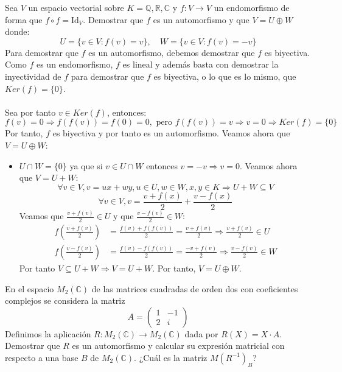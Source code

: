 \begin{ejercicio}
	Sea \( V \) un espacio vectorial sobre \( K = \mathbb{Q}, \mathbb{R}, \mathbb{C} \) y \( f : V \rightarrow V \) un endomorfismo de forma que \( f \circ f = \text{Id}_V \). Demostrar que \( f \) es un automorfismo y que \( V = U \oplus W \) donde:
	\[ U = \{ v \in V : f(v) = v \}, \quad W = \{ v \in V : f(v) = -v \} \]
	Para demostrar que $f$ es un automorfismo, debemos demostrar que $f$ es biyectiva. Como $f$ es un endomorfismo, $f$ es lineal y además basta con demostrar la
	inyectividad de $f$ para demostrar que $f$ es biyectiva, o lo que es lo mismo, que $Ker(f) = \{0\}$. \\ \\
	Sea por tanto $v \in Ker(f)$, entonces:
	\begin{equation*}
		f(v) = 0 \Rightarrow f(f(v)) = f(0) = 0, \text{ pero } f(f(v)) = v \Rightarrow v = 0 \Rightarrow Ker(f) = \{0\}
	\end{equation*}
	Por tanto, $f$ es biyectiva y por tanto es un automorfismo. Veamos ahora que $V = U \oplus W$:
	\begin{itemize}
		\item {} $U \cap W = \{0\}$ ya que si $v \in U \cap W$ entonces $v=-v \Rightarrow v=0$. Veamos ahora que $V = U + W$:
		      \begin{equation*}
			      \forall v \in V, v=ux+wy, u \in U, w \in W, x,y \in K \Rightarrow U + W \subseteq V
		      \end{equation*}
		      \begin{equation*}
			      \forall v \in V, v = \frac{v+f(x)}{2}+\frac{v-f(x)}{2}
		      \end{equation*}
		      Veamos que $\frac{v+f(v)}{2} \in U$ y que $\frac{v-f(v)}{2} \in W$:
		      \begin{align*}
			      f\left(\frac{v+f(v)}{2}\right) & = \frac{f(v)+f(f(v))}{2} = \frac{v+f(v)}{2} \Rightarrow \frac{v+f(v)}{2} \in U  \\
			      f\left(\frac{v-f(v)}{2}\right) & = \frac{f(v)-f(f(v))}{2} = \frac{-v+f(v)}{2} \Rightarrow \frac{v-f(v)}{2} \in W
		      \end{align*}
		      Por tanto $V \subseteq U + W \Rightarrow V = U + W$. Por tanto, $V = U \oplus W$.
	\end{itemize}
\end{ejercicio}

\begin{ejercicio}
	En el espacio \( M_2(\mathbb{C}) \) de las matrices cuadradas de orden dos con coeficientes complejos se considera la matriz
	\[ A = \begin{pmatrix} 1 & -1 \\ 2 & i \end{pmatrix} \]
	Definimos la aplicación \( R : M_2(\mathbb{C}) \rightarrow M_2(\mathbb{C}) \) dada por \( R(X) = X \cdot A \). Demostrar que \( R \) es un automorfismo y calcular su expresión matricial con respecto a una base \( B \) de \( M_2(\mathbb{C}) \). ¿Cuál es la matriz \( M(R^{-1})_B \)?
\end{ejercicio}



